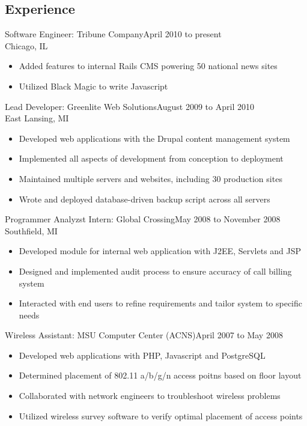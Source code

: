 \documentclass[]{res}
\begin{document}


\begin{resume}


\section{Experience}
Software Engineer: Tribune Company\dotfill April 2010 to present\\
Chicago, IL
\begin{itemize}
\item Added features to internal Rails CMS powering 50 national news sites
\item Utilized Black Magic to write Javascript
\end{itemize}

Lead Developer: Greenlite Web Solutions\dotfill August 2009 to April 2010\\
East Lansing, MI
\begin{itemize}
\item Developed web applications with the Drupal content management system
\item Implemented all aspects of development from conception to deployment
\item Maintained multiple servers and websites, including 30 production sites
\item Wrote and deployed database-driven backup script across all servers
\end{itemize}

Programmer Analyzst Intern: Global Crossing\dotfill May 2008 to November 2008\\
Southfield, MI
\begin{itemize}
\item Developed module for internal web application with J2EE, Servlets and JSP
\item Designed and implemented audit process to ensure accuracy of call billing system
\item Interacted with end users to refine requirements and tailor system to specific needs
\end{itemize}

Wireless Assistant: MSU Computer Center (ACNS)\dotfill April 2007 to May 2008
\begin{itemize}
\item Developed web applications with PHP, Javascript and PostgreSQL
\item Determined placement of 802.11 a/b/g/n access poitns based on floor layout
\item Collaborated with network engineers to troubleshoot wireless problems
\item Utilized wireless survey software to verify optimal placement of access points
\end{itemize}



\end{resume}
\end{document}
